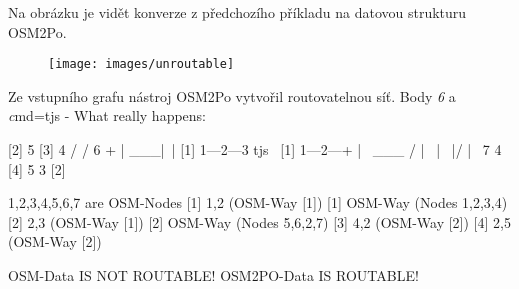 Na obrázku je vidět konverze z předchozího příkladu na datovou strukturu OSM2Po.

\begin{figure}[ht]
\texttt{[image: images/unroutable]}
\end{figure}

Ze vstupního grafu nástroj OSM2Po vytvořil routovatelnou síť. Body \textit{6} a \textit

cmd=tjs - What really happens:

                    [2] 5                             [3] 4
                       /                                 /
                      6                                 +
                      |            ___|\                |
              [1] 1---2---3        tjs  \       [1] 1---2---+
                      |    \       ___  /               |    \
                      |     \         |/                |     \
                      7      4                      [4] 5      3 [2]

              1,2,3,4,5,6,7 are OSM-Nodes       [1] 1,2  (OSM-Way [1])
              [1] OSM-Way (Nodes 1,2,3,4)       [2] 2,3  (OSM-Way [1])
              [2] OSM-Way (Nodes 5,6,2,7)       [3] 4,2  (OSM-Way [2])
                                                [4] 2,5  (OSM-Way [2])

              OSM-Data IS NOT ROUTABLE!         OSM2PO-Data IS ROUTABLE!




















